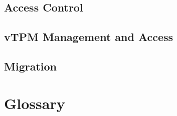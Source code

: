\documentclass[10pt]{article}
\begin{document}
\subsection{Access Control}

\subsection{vTPM Management and Access}

\subsection{Migration}

\appendix

\section{Glossary}



\end{document}
